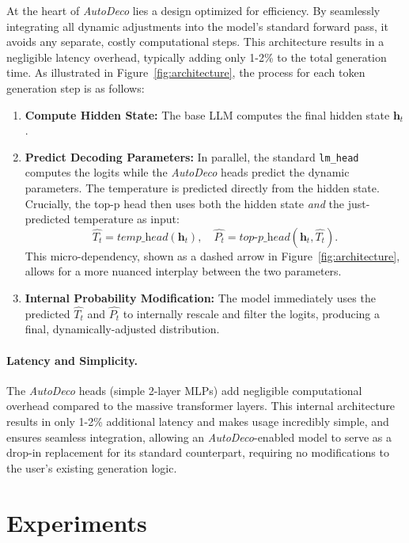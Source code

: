 At the heart of \textit{AutoDeco} lies a design optimized for efficiency. By seamlessly integrating all dynamic adjustments into the model's standard forward pass, it avoids any separate, costly computational steps. This architecture results in a negligible latency overhead, typically adding only 1-2\% to the total generation time. As illustrated in Figure~\ref{fig:architecture}, the process for each token generation step is as follows:
\begin{enumerate}[leftmargin=2em, ]
    \item \textbf{Compute Hidden State:} The base LLM computes the final hidden state $\mathbf{h}_t$.

    \item \textbf{Predict Decoding Parameters:} In parallel, the standard \texttt{lm\_head} computes the logits while the \textit{AutoDeco} heads predict the dynamic parameters. The temperature is predicted directly from the hidden state. Crucially, the top-p head then uses both the hidden state \textit{and} the just-predicted temperature as input:
    \begin{equation}
                \hat{T_t} = \textit{temp\_head}(\mathbf{h}_t),\quad \hat{P_t} = \textit{top-p\_head}(\mathbf{h}_t, \hat{T_t}).
    \end{equation}
    This micro-dependency, shown as a dashed arrow in Figure~\ref{fig:architecture}, allows for a more nuanced interplay between the two parameters.

    \item \textbf{Internal Probability Modification:} The model immediately uses the predicted $\hat{T_t}$ and $\hat{P_t}$ to internally rescale and filter the logits, producing a final, dynamically-adjusted distribution.
\end{enumerate}

\paragraph{Latency and Simplicity.}
The \textit{AutoDeco} heads (simple 2-layer MLPs) add negligible computational overhead compared to the massive transformer layers. This internal architecture results in only 1-2\% additional latency and makes usage incredibly simple, and ensures seamless integration, allowing an \textit{AutoDeco}-enabled model to serve as a drop-in replacement for its standard counterpart, requiring no modifications to the user's existing generation logic.

\section{Experiments}
\label{sec:experiments}

